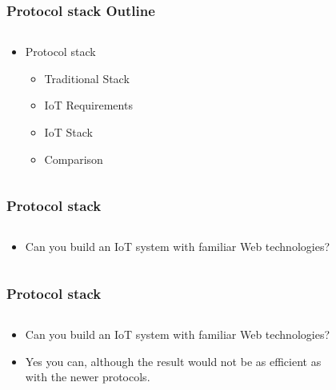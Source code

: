 \documentclass{beamer}
\begin{document}
\begin{frame}
	\frametitle{Protocol stack Outline}
	\begin{columns}[c]
		\begin{column}{30cm}
			\vspace{.1cm}
			\begin{itemize}
				\justifying
				\item Protocol stack
				\begin{itemize}
					\item Traditional Stack
					\item IoT Requirements
					\item IoT Stack
					\item Comparison
				\end{itemize}
			\end{itemize}
		\end{column}
	\end{columns}
\end{frame}

\begin{frame}
	\frametitle{Protocol stack}
	\begin{columns}[c]
		\begin{column}{30cm}
			\vspace{.1cm}
			\begin{itemize}
				\justifying
				\item Can you build an IoT system with familiar Web technologies?
			\end{itemize}
		\end{column}
	\end{columns}
\end{frame}

\begin{frame}
	\frametitle{Protocol stack}
	\begin{columns}[c]
		\begin{column}{30cm}
			\vspace{.1cm}
			\begin{itemize}
				\justifying
				\item Can you build an IoT system with familiar Web technologies?
				\item Yes you can, although the result would not be as \textcolor{Ocean}{efficient} as\\
				with the \textcolor{TextGreen}{newer protocols}.
			\end{itemize}
		\end{column}
	\end{columns}
\end{frame}
\end{document}
